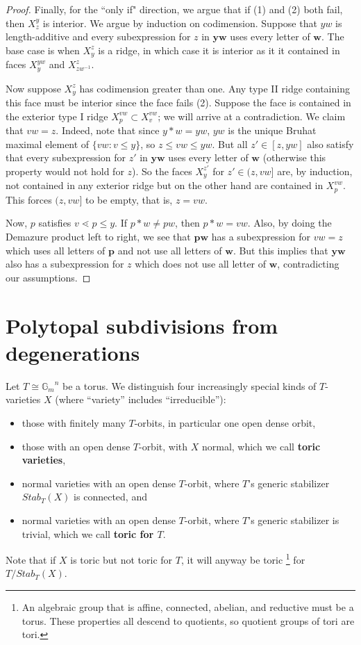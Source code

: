 \documentclass[10pt,a4paper]{amsart}
\newcommand\defn[1]{{\bf #1}}
\def\bw{\mathbf{w}}
\newcommand\Gm{{\mathbb G}_m}
\newcommand\iso\cong
\begin{document}
\begin{proof}
	Finally, for the ``only if" direction, we argue that if (1) and (2) both fail, then $X^y_z$ is interior. We argue by induction on codimension. Suppose that $yw$ is length-additive and every subexpression for $z$ in $\mathbf{y}\bw$ uses every letter of $\bw$. The base case is when $X_y^z$ is a ridge, in which case it is interior as it it contained in faces $X_y^{yw}$ and $X_{zw^{-1}}^z$. 
	
	Now suppose $X_y^z$ has codimension greater than one. Any type II ridge containing this face must be interior since the face fails (2). Suppose the face is contained in the exterior type I ridge $X_p^{vw} \subset X_v^{vw}$; we will arrive at a contradiction. We claim that $vw=z$. Indeed, note that since $y * w = yw$, $yw$ is the unique Bruhat maximal element of $\{vw: v \leq y\}$, so $z \leq vw \leq yw$.
	But all $z' \in [z, yw]$ also satisfy that every subexpression for $z'$ in $\mathbf{y}\bw$ uses every letter of $\bw$ (otherwise this property would not hold for $z$). So the faces $X_y^{z'}$ for $z' \in (z, vw]$ are, by induction, not contained in any exterior ridge but on the other hand are contained in $X_p^{vw}$. This forces $(z, vw]$ to be empty, that is, $z=vw$.
	
	Now, $p$ satisfies $v \lessdot p \leq y$. If $p*w \neq pw$, then $p*w=vw$. Also, by doing the Demazure product left to right, we see that $\mathbf{p} \bw$ has a subexpression for $vw=z$ which uses all letters of $\mathbf{p}$ and not use all letters of $\bw$. But this implies that $\mathbf{y} \bw$ also has a subexpression for $z$ which does not use all letter of $\bw$, contradicting our assumptions.	
\end{proof}



\section{Polytopal subdivisions from degenerations} \label{sec:subdiv-from-degen}

Let $T \iso {\Gm}^n$ be a torus. We distinguish four increasingly
special kinds of $T$-varieties $X$ (where ``variety'' includes ``irreducible''):
\begin{itemize}
\item those with finitely many $T$-orbits, in particular one open dense orbit,
\item those with an open dense $T$-orbit, with $X$ normal, which we
  call \defn{toric varieties},
\item normal varieties with an open dense $T$-orbit, where $T$'s generic
  stabilizer $Stab_T(X)$ is connected, and
\item normal varieties with an open dense $T$-orbit, where $T$'s generic
  stabilizer is trivial, which we call \defn{toric for $T$}.
\end{itemize}
Note that if $X$ is toric but not toric for $T$, it will anyway be toric%
\footnote{An algebraic group that is affine, connected, abelian, and
  reductive must be a torus. These properties all descend to
  quotients, so quotient groups of tori are tori.}
for $T/Stab_T(X)$.
\end{document}
